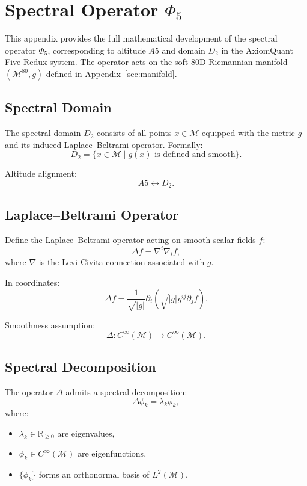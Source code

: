 \section{Spectral Operator \texorpdfstring{$\Phi_5$}{Phi5}}
\label{sec:spectral}

This appendix provides the full mathematical development of the spectral
operator $\Phi_5$, corresponding to altitude $A5$ and domain $D_2$ in the
AxiomQuant Five Redux system. The operator acts on the soft 80D Riemannian
manifold $(\mathcal{M}^{80}, g)$ defined in Appendix~\ref{sec:manifold}.

\subsection{Spectral Domain}

The spectral domain $D_2$ consists of all points $x \in \mathcal{M}$ equipped
with the metric $g$ and its induced Laplace--Beltrami operator. Formally:
\[
D_2 = \{ x \in \mathcal{M} \mid g(x) \text{ is defined and smooth} \}.
\]

Altitude alignment:
\[
A5 \leftrightarrow D_2.
\]

\subsection{Laplace--Beltrami Operator}

Define the Laplace--Beltrami operator acting on smooth scalar fields $f$:
\[
\Delta f = \nabla^i \nabla_i f,
\]
where $\nabla$ is the Levi-Civita connection associated with $g$.

In coordinates:
\[
\Delta f = \frac{1}{\sqrt{|g|}}
\partial_i \left( \sqrt{|g|} g^{ij} \partial_j f \right).
\]

Smoothness assumption:
\[
\Delta : C^\infty(\mathcal{M}) \to C^\infty(\mathcal{M}).
\]

\subsection{Spectral Decomposition}

The operator $\Delta$ admits a spectral decomposition:
\[
\Delta \phi_k = \lambda_k \phi_k,
\]
where:
\begin{itemize}
    \item $\lambda_k \in \mathbb{R}_{\ge 0}$ are eigenvalues,
    \item $\phi_k \in C^\infty(\mathcal{M})$ are eigenfunctions,
    \item $\{\phi_k\}$ forms an orthonormal basis of $L^2(\mathcal{M})$.
\end{itemize}

